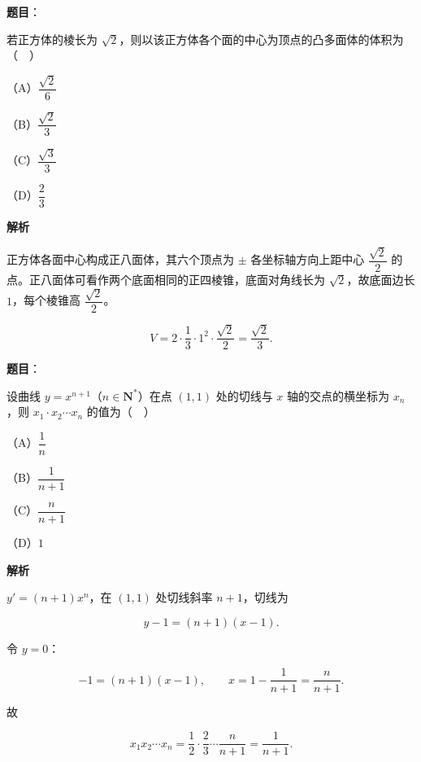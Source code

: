 \begin{answer}

\textbf{题目}：

若正方体的棱长为 $\sqrt2$，则以该正方体各个面的中心为顶点的凸多面体的体积为（　）

（A）$\dfrac{\sqrt2}6$

（B）$\dfrac{\sqrt2}3$

（C）$\dfrac{\sqrt3}3$

（D）$\dfrac23$

\textbf{解析}

正方体各面中心构成正八面体，其六个顶点为 $\pm$ 各坐标轴方向上距中心 $\dfrac{\sqrt2}2$ 的点。正八面体可看作两个底面相同的正四棱锥，底面对角线长为 $\sqrt2$，故底面边长 $1$，每个棱锥高 $\dfrac{\sqrt2}2$。

\nopagebreak[4]
\[V=2\cdot\frac13\cdot1^2\cdot\frac{\sqrt2}2=\frac{\sqrt2}3.\]


\end{answer}
\begin{answer}

\textbf{题目}：

设曲线 $y=x^{n+1}$（$n\in\mathbf N^*$）在点 $(1,1)$ 处的切线与 $x$ 轴的交点的横坐标为 $x_n$，则 $x_1\cdot x_2\cdots x_n$ 的值为（　）

（A）$\dfrac1n$

（B）$\dfrac1{n+1}$

（C）$\dfrac n{n+1}$

（D）$1$

\textbf{解析}

$y'=(n+1)x^n$，在 $(1,1)$ 处切线斜率 $n+1$，切线为

\nopagebreak[4]
\[y-1=(n+1)(x-1).\]

令 $y=0$：

\nopagebreak[4]
\[-1=(n+1)(x-1),\qquad x=1-\frac1{n+1}=\frac n{n+1}.\]

故

\nopagebreak[4]
\[x_1x_2\cdots x_n=\frac12\cdot\frac23\cdots\frac n{n+1}=\frac1{n+1}.\]


\end{answer}
